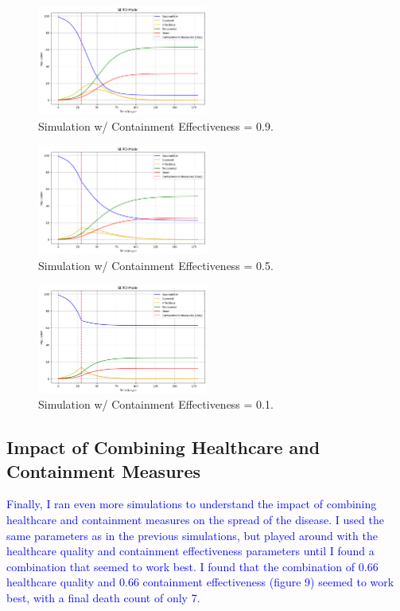 \documentclass[%
 reprint,
superscriptaddress,
 amsmath,amssymb,
 aps,
floatfix,
]{revtex4-2}
\begin{document}
\begin{figure}[hbt!]
    \centering
    \includegraphics[width=0.5\textwidth]{ContainmentA.png}
    \caption{Simulation w/ Containment Effectiveness = 0.9.}
    \label{ContainmentA}
\end{figure}
\begin{figure}
    \centering
    \includegraphics[width=0.5\textwidth]{ContainmentB.png}
    \caption{Simulation w/ Containment Effectiveness = 0.5.}
    \label{ContainmentB}
\end{figure}
\begin{figure}
    \centering
    \includegraphics[width = 0.5\textwidth]{ContainmentC.png}
    \caption{Simulation w/ Containment Effectiveness = 0.1.}
    \label{ContainmentC}
\end{figure}

\subsection{Impact of Combining Healthcare and Containment Measures}
\textcolor{blue}{
    Finally, I ran even more simulations to understand the impact of combining healthcare and containment measures on the spread of the disease.
    I used the same parameters as in the previous simulations, but played around with the healthcare quality and containment effectiveness parameters until I found a combination that seemed to work best.
    I found that the combination of 0.66 healthcare quality and 0.66 containment effectiveness (figure 9) seemed to work best, with a final death count of only 7.}
\end{document}
